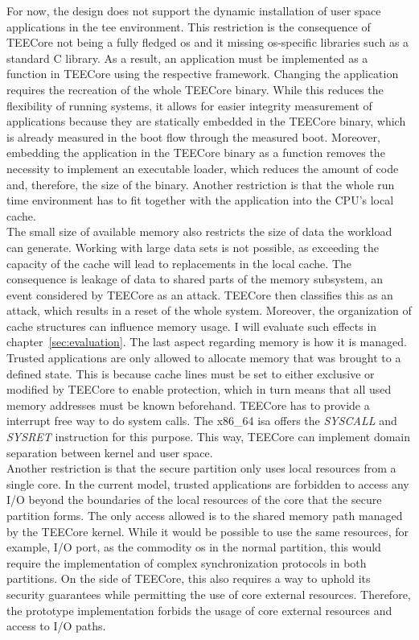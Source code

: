 For now, the design does not support the dynamic installation of user space
applications in the \gls{tee} environment. This restriction is the consequence
of TEECore not being a fully fledged \gls{os} and it missing \gls{os}-specific
libraries such as a standard C library. As a result, an application must be
implemented as a function in TEECore using the respective framework.
Changing the application requires the recreation of the whole TEECore binary.
While this reduces the flexibility of running systems, it allows for easier
integrity measurement of applications because they are statically embedded in
the TEECore binary, which is already measured in the boot flow through the
measured boot. Moreover, embedding the application in the TEECore binary as a
function removes the necessity to implement an executable loader, which reduces
the amount of code and, therefore, the size of the binary. Another restriction
is that the whole run time environment has to fit together with the application
into the CPU's local cache.\\

The small size of available memory also restricts the size of data the workload
can generate. Working with large data sets is not possible, as exceeding the
capacity of the cache will lead to replacements in the local cache. The
consequence is leakage of data to shared parts of the memory subsystem, an event
considered by TEECore as an attack. TEECore then classifies this as an attack,
which results in a reset of the whole system. Moreover, the organization of
cache structures can influence memory usage. I will evaluate such effects in
chapter~\ref{sec:evaluation}. The last aspect regarding memory is how it is
managed. Trusted applications are only allowed to allocate memory that was
brought to a defined state. This is because cache lines must be set to either
exclusive or modified by TEECore to enable protection, which in turn means that
all used memory addresses must be known beforehand. TEECore has to provide a
interrupt free way to do system calls. The x86\_64 \gls{isa} offers the
\textit{SYSCALL} and \textit{SYSRET} instruction for this purpose. This way,
TEECore can implement domain separation between kernel and user space.\\

Another restriction is that the secure partition only uses local resources from
a single core. In the current model, trusted applications are forbidden to
access any I/O beyond the boundaries of the local resources of the core that the
secure partition forms. The only access allowed is to the shared memory path
managed by the TEECore kernel. While it would be possible to use the same
resources, for example, I/O port, as the commodity \gls{os} in the normal
partition, this would require the implementation of complex synchronization
protocols in both partitions. On the side of TEECore, this also requires a way
to uphold its security guarantees while permitting the use of core external
resources. Therefore, the prototype implementation forbids the usage of core
external resources and access to I/O paths.

